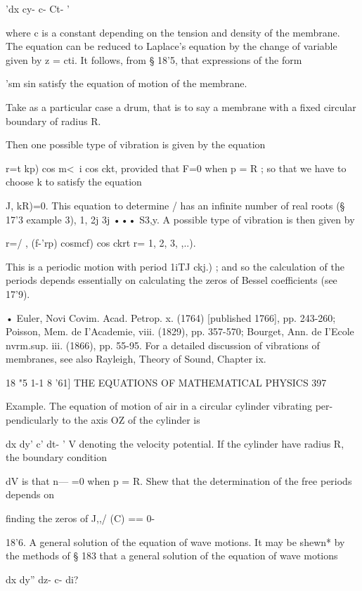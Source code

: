 'dx cy- c- Ct- '

where c is a constant depending on the tension and density of the
membrane. The equation can be reduced to Laplace's equation by the
change of variable given by z = cti. It follows, from § 18'5, that
expressions of the form

'sm sin satisfy the equation of motion of the membrane.

Take as a particular case a drum, that is to say a membrane with a
fixed circular boundary of radius R.

Then one possible type of vibration is given by the equation

r=t kp) cos m<\ i cos ckt, provided that F=0 when p = R ; so that we
have to choose k to satisfy the equation

J, kR)=0. This equation to determine / has an infinite number of real
roots (§ 17'3 example 3), 1, 2j 3j ••• S3,y. A possible type of
vibration is then given by

r=/ , (f-'rp) cosmcf) cos ckrt r= 1, 2, 3, ,..).

This is a periodic motion with period 1iTJ ckj.) ; and so the
calculation of the periods depends essentially on calculating the
zeros of Bessel coefficients (see 17'9).

• Euler, Novi Covim. Acad. Petrop. x. (1764) [published 1766], pp.
243-260; Poisson, Mem. de I'Academie, viii. (1829), pp. 357-570;
Bourget, Ann. de I'Ecole nvrm.sup. iii. (1866), pp. 55-95. For a
detailed discussion of vibrations of membranes, see also Rayleigh,
Theory of Sound, Chapter ix.



18 "5 1-1 8 '61] THE EQUATIONS OF MATHEMATICAL PHYSICS 397

Example. The equation of motion of air in a circular cylinder
vibrating per- pendicularly to the axis OZ of the cylinder is

dx dy' c' dt- ' V denoting the velocity potential. If the cylinder
have radius R, the boundary condition

dV is that n— =0 when p = R. Shew that the determination of the free
periods depends on

finding the zeros of J,,/ (C) == 0-

18'6. A general solution of the equation of wave motions. It may be
shewn* by the methods of § 183 that a general solution of the equation
of wave motions

dx dy'' dz- c- di?



